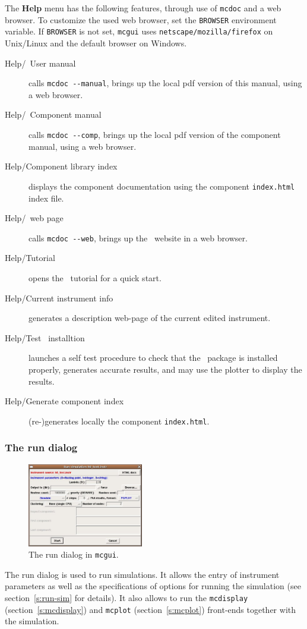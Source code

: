 \noindent The {\bf Help} menu has the following features, through use of
\verb+mcdoc+ and a web browser. To customize the used web browser, set
the \verb+BROWSER+ environment variable. If \verb+BROWSER+ is not set,
\verb+mcgui+ uses \verb+netscape/mozilla/firefox+ on Unix/Linux and the default browser on
Windows.
\begin{description}
\item[Help/\MCS\ User manual] calls \verb+mcdoc --manual+, brings up the local
  pdf version of this manual, using a web browser.
\item[Help/\MCS\ Component manual] calls \verb+mcdoc --comp+, brings up the local
  pdf version of the component manual, using a web browser.
\item[Help/Component library index] displays the component documentation using
  the component \verb+index.html+ index file.
\item[Help/\MCS\ web page] calls \verb+mcdoc --web+, brings up the \MCS\
  website in a web browser.
\item[Help/Tutorial] opens the \MCS\ tutorial for a quick start.
\item[Help/Current instrument info] generates a description web-page of the current edited instrument.
\item[Help/Test \MCS\ installtion] launches a self test procedure to check that the \MCS\ package is installed properly, generates accurate results, and may use the plotter to display the results.
\item[Help/Generate component index] (re-)generates locally the component \verb+index.html+.
\end{description}


\subsubsection{The run dialog}

\begin{figure}[htb!]
  \begin{center}
    \includegraphics[width=0.45\textwidth]{figures/mcgui-run.eps}
  \end{center}
\caption{The run dialog in \texttt{mcgui}.}
\label{fig:mcgui-run}
\end{figure}
%
The run dialog is used to run simulations. It allows the entry of
instrument parameters as well as the specifications of options for
running the simulation (see section~\ref{s:run-sim} for details). It
also allows to run the \verb+mcdisplay+ (section~\ref{s:mcdisplay}) and
\verb+mcplot+ (section~\ref{s:mcplot}) front-ends together with the
simulation.\index{Tools!mcplot}

